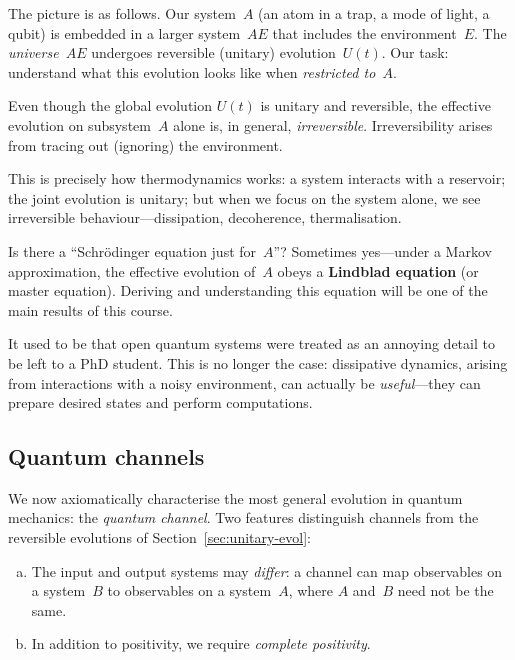 The picture is as follows.  Our system~$A$ (an atom in a trap, a mode of
light, a qubit) is embedded in a larger system~$AE$ that includes the
environment~$E$.  The \emph{universe}~$AE$ undergoes reversible
(unitary) evolution~$U(t)$.  Our task: understand what this evolution
looks like when \emph{restricted to~$A$}.

\begin{keyresult}
  Even though the global evolution $U(t)$ is unitary and reversible,
  the effective evolution on subsystem~$A$ alone is, in general,
  \emph{irreversible}.  Irreversibility arises from tracing out
  (ignoring) the environment.
\end{keyresult}

This is precisely how thermodynamics works: a system interacts with a
reservoir; the joint evolution is unitary; but when we focus on the
system alone, we see irreversible behaviour---dissipation, decoherence,
thermalisation.

\begin{intuition}
  Is there a ``Schr\"odinger equation just for~$A$''?  Sometimes
  yes---under a Markov approximation, the effective evolution of~$A$
  obeys a \textbf{Lindblad equation} (or master equation).  Deriving
  and understanding this equation will be one of the main results of
  this course.
\end{intuition}

It used to be that open quantum systems were treated as an annoying
detail to be left to a PhD student.  This is no longer the case:
dissipative dynamics, arising from interactions with a noisy
environment, can actually be \emph{useful}---they can prepare desired
states and perform computations.

\subsection{Quantum channels}\label{sec:channels}

We now axiomatically characterise the most general evolution in quantum
mechanics: the \emph{quantum channel}.  Two features distinguish
channels from the reversible evolutions of Section~\ref{sec:unitary-evol}:
\begin{enumerate}[(a)]
  \item The input and output systems may \emph{differ}: a channel can
    map observables on a system~$B$ to observables on a system~$A$,
    where $A$ and~$B$ need not be the same.
  \item In addition to positivity, we require \emph{complete
    positivity}.
\end{enumerate}

